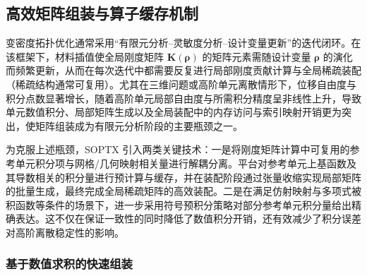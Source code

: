 \subsection{高效矩阵组装与算子缓存机制}
\label{subsec:fast_assmbly}

变密度拓扑优化通常采用“有限元分析--灵敏度分析--设计变量更新”的迭代闭环。在该框架下，材料插值使全局刚度矩阵 $\boldsymbol{K}(\boldsymbol{\rho})$ 的矩阵元素需随设计变量 $\boldsymbol{\rho}$ 的演化而频繁更新，从而在每次迭代中都需要反复进行局部刚度贡献计算与全局稀疏装配（稀疏结构通常可复用）。尤其在三维问题或高阶单元离散情形下，位移自由度与积分点数显著增长，随着高阶单元局部自由度与所需积分精度呈非线性上升，导致单元数值积分、局部矩阵生成以及全局装配中的内存访问与索引映射开销更为突出，使矩阵组装成为有限元分析阶段的主要瓶颈之一。

为克服上述瓶颈，SOPTX 引入两类关键技术：一是将刚度矩阵计算中可复用的参考单元积分项与网格/几何映射相关量进行解耦分离。平台对参考单元上基函数及其导数相关的积分量进行预计算与缓存，并在装配阶段通过张量收缩实现局部矩阵的批量生成，最终完成全局稀疏矩阵的高效装配。二是在满足仿射映射与多项式被积函数等条件的场景下，进一步采用符号预积分策略对部分参考单元积分量给出精确表达。这不仅在保证一致性的同时降低了数值积分开销，还有效减少了积分误差对高阶离散稳定性的影响。

\subsubsection*{基于数值求积的快速组装}

